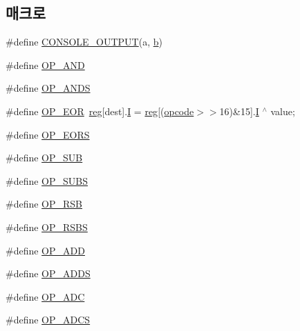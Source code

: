 \subsection*{매크로}
\begin{DoxyCompactItemize}
\item 
\#define \mbox{\hyperlink{arm-new_8h_a8b6846a8c0b8303ae41cedebbeb79965}{C\+O\+N\+S\+O\+L\+E\+\_\+\+O\+U\+T\+P\+UT}}(a,  \mbox{\hyperlink{expr-lex_8cpp_a91b64995742fd30063314f12340b4b5a}{b}})
\item 
\#define \mbox{\hyperlink{arm-new_8h_ac56577e3b08d3c7453db5d81d96bf05b}{O\+P\+\_\+\+A\+ND}}
\item 
\#define \mbox{\hyperlink{arm-new_8h_aa69b64b0a164fc639f436a21fdacf2fd}{O\+P\+\_\+\+A\+N\+DS}}
\item 
\#define \mbox{\hyperlink{arm-new_8h_a44564daea0fc9592c786bec61e18510e}{O\+P\+\_\+\+E\+OR}}~\mbox{\hyperlink{_globals_8h_ae29faba89509024ffd1a292badcedf2d}{reg}}\mbox{[}dest\mbox{]}.\mbox{\hyperlink{thumb_8h_a782b7c7c9a56a2031f6270eac7f000d6}{I}} = \mbox{\hyperlink{_globals_8h_ae29faba89509024ffd1a292badcedf2d}{reg}}\mbox{[}(\mbox{\hyperlink{thumb_8h_a4fc220098f4b9d0e039a28274d05c198}{opcode}}$>$$>$16)\&15\mbox{]}.\mbox{\hyperlink{thumb_8h_a782b7c7c9a56a2031f6270eac7f000d6}{I}} $^\wedge$ value;
\item 
\#define \mbox{\hyperlink{arm-new_8h_ae4b314376e397bf3182aa7def0d7404c}{O\+P\+\_\+\+E\+O\+RS}}
\item 
\#define \mbox{\hyperlink{arm-new_8h_abe4a72f7e3f753e7059bc2f2a01a0cfc}{O\+P\+\_\+\+S\+UB}}
\item 
\#define \mbox{\hyperlink{arm-new_8h_af7ad443f7a99539feae657dfff0db8f6}{O\+P\+\_\+\+S\+U\+BS}}
\item 
\#define \mbox{\hyperlink{arm-new_8h_adf32c701a0a978533f69ce934229356b}{O\+P\+\_\+\+R\+SB}}
\item 
\#define \mbox{\hyperlink{arm-new_8h_abe9b27e4c5be88069b41e0a7c9ccb342}{O\+P\+\_\+\+R\+S\+BS}}
\item 
\#define \mbox{\hyperlink{arm-new_8h_a073d010839a6dc707f3031db67149870}{O\+P\+\_\+\+A\+DD}}
\item 
\#define \mbox{\hyperlink{arm-new_8h_a65004b5c348ae16b8a2b8e0b9f02b9d4}{O\+P\+\_\+\+A\+D\+DS}}
\item 
\#define \mbox{\hyperlink{arm-new_8h_ac12e4e04c89f3959eaf58c68f88185e0}{O\+P\+\_\+\+A\+DC}}
\item 
\#define \mbox{\hyperlink{arm-new_8h_ab1994f2856458d70ba65c58f1f651cf7}{O\+P\+\_\+\+A\+D\+CS}}
\item 
$$
\end{DoxyCompactItemize}

